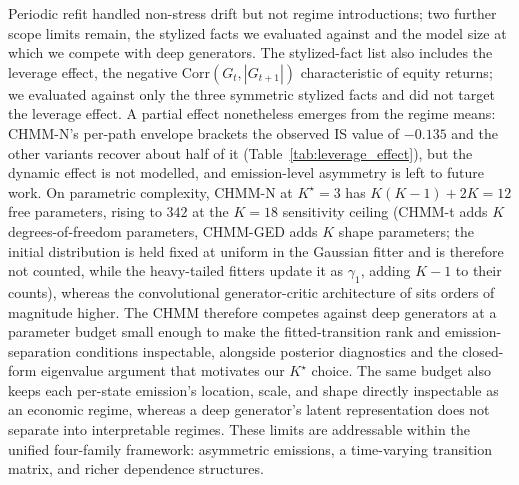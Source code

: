 Periodic refit handled non-stress drift but not regime introductions; two further scope limits remain, the stylized facts we evaluated against and the model size at which we compete with deep generators. The \citet{cont2001empirical} stylized-fact list also includes the leverage effect, the negative $\mathrm{Corr}(G_t, |G_{t+1}|)$ characteristic of equity returns; we evaluated against only the three symmetric stylized facts and did not target the leverage effect. A partial effect nonetheless emerges from the regime means: CHMM-N's per-path envelope brackets the observed IS value of $-0.135$ and the other variants recover about half of it (Table~\ref{tab:leverage_effect}), but the dynamic effect is not modelled, and emission-level asymmetry is left to future work. On parametric complexity, CHMM-N at $K^\star = 3$ has $K(K-1) + 2K = 12$ free parameters, rising to $342$ at the $K = 18$ sensitivity ceiling (CHMM-t adds $K$ degrees-of-freedom parameters, CHMM-GED adds $K$ shape parameters; the initial distribution is held fixed at uniform in the Gaussian fitter and is therefore not counted, while the heavy-tailed fitters update it as $\gamma_1$, adding $K - 1$ to their counts), whereas the convolutional generator-critic architecture of \citet{wiese2020quantgan} sits orders of magnitude higher. The CHMM therefore competes against deep generators at a parameter budget small enough to make the fitted-transition rank and emission-separation conditions inspectable, alongside posterior diagnostics and the closed-form eigenvalue argument that motivates our $K^\star$ choice. The same budget also keeps each per-state emission's location, scale, and shape directly inspectable as an economic regime, whereas a deep generator's latent representation does not separate into interpretable regimes. These limits are addressable within the unified four-family framework: asymmetric emissions, a time-varying transition matrix, and richer dependence structures.
